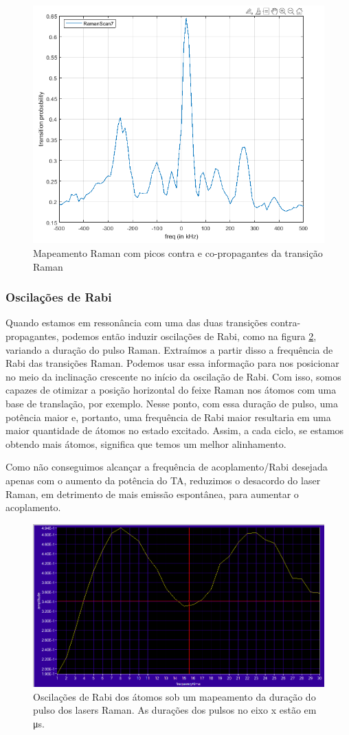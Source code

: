 \begin{figure}
    \centering
    \includegraphics[width=0.5\linewidth]{figures/propagating.png}
    \caption{Mapeamento Raman com picos contra e co-propagantes da transição Raman}
    \label{fig:prop}
\end{figure}

\subsubsection{Oscilações de Rabi}
Quando estamos em ressonância com uma das duas transições contra-propagantes, podemos então induzir oscilações de Rabi, como na figura \ref{fig:rabi}, variando a duração do pulso Raman. Extraímos a partir disso a frequência de Rabi das transições Raman. Podemos usar essa informação para nos posicionar no meio da inclinação crescente no início da oscilação de Rabi. Com isso, somos capazes de otimizar a posição horizontal do feixe Raman nos átomos com uma base de translação, por exemplo. Nesse ponto, com essa duração de pulso, uma potência maior e, portanto, uma frequência de Rabi maior resultaria em uma maior quantidade de átomos no estado excitado. Assim, a cada ciclo, se estamos obtendo mais átomos, significa que temos um melhor alinhamento.

Como não conseguimos alcançar a frequência de acoplamento/Rabi desejada apenas com o aumento da potência do \gls{TA}, reduzimos o desacordo do laser Raman, em detrimento de mais emissão espontânea, para aumentar o acoplamento.

\begin{figure}
    \centering
    \includegraphics[width=0.5\linewidth]{figures/RabiOsc1.png}
    \caption{Oscilações de Rabi dos átomos sob um mapeamento da duração do pulso dos lasers Raman. As durações dos pulsos no eixo x estão em \si{\micro s}.}
    \label{fig:rabi}
\end{figure}

